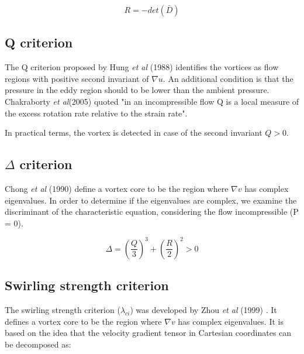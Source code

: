 \documentclass[12pt, a4paper, openany]{memoir}
\begin{document}
\begin{equation}
R = -det(\bar{D})
\end{equation}

\subsection{Q criterion}

The Q criterion proposed by Hung \textit{et al} (1988) identifies the vortices as flow regions with positive second invariant of $\nabla u$. An additional condition is that the pressure in the eddy region should to be lower than the ambient pressure. Chakraborty \textit{et al}(2005) \cite{chakra2005} quoted "in an incompressible flow Q is a local measure of the excess rotation rate relative to the strain rate".

In practical terms, the vortex is detected in case of the second invariant $Q > 0$.

\subsection{$\Delta$ criterion}

Chong \textit{et al} (1990) \cite{chong1990} define a vortex core to be the region where $\nabla v$ has complex eigenvalues. In order to determine if the eigenvalues are complex, we examine the discriminant of the characteristic equation, considering the flow incompressible (P = 0).

\begin{equation}
\Delta = \left(\frac{Q}{3}\right)^3 + \left(\frac{R}{2}\right)^2 > 0
\end{equation}


\subsection{Swirling strength criterion}

The swirling strength criterion ($\lambda_{ci}$) was developed by Zhou \textit{et al} (1999) \cite{zhou1999}. It defines a vortex core to be the region where $\nabla v$ has complex eigenvalues. It is based on the idea that the velocity gradient tensor in Cartesian coordinates can be decomposed as:
\end{document}
